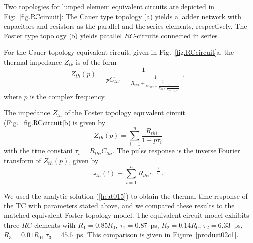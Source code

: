 \documentclass[journal]{IEEEtran}
\begin{document}
Two topologies for lumped element equivalent circuits are depicted in Fig:~\ref{fig.RCcircuit}: The Cauer type topology (a) yields a ladder network with capacitors and resistors as the parallel and the series elements, respectively. The Foster type topology (b) yields parallel $RC$-circuits connected in series.

For the Cauer topology equivalent circuit, given in Fig.~\ref{fig.RCcircuit}a, the thermal impedance $Z_{th}$ is of the form
%
\begin{equation} \label{thermalimpedance01}
	Z_{th}(p) = \frac{1}{p C_{th1}+\frac{1}{{R_{th1}+\frac{1}{p C_{th2}+\frac{1}{R_{th2}+\frac{1}{p C_{th3}+\frac{1}{{R_{th3}+ \cdots}}}}}}}} \, ,
\end{equation}
%
where $p$ is the complex frequency. 


%
The impedance $Z_{th}$ of the Foster topology equivalent circuit (Fig.~\ref{fig.RCcircuit}b) is given by
%
\begin{equation} \label{thermalimpedance02}
	Z_{th}(p) = \sum_{i=1}^n\frac{R_{thi}}{1+ p \tau_i }
\end{equation}
%
with the time constant $\tau_i = R_{thi}C_{thi}$. The pulse response  is the inverse Fourier transform of $Z_{th}(p)$, given  by
%
\begin{equation}
	z_{th}(t) = \sum_{i=1}^n  R_{thi}e^{-\frac{t}{ \tau_i }} \, .
\end{equation}
%

We used the analytic solution (\ref{heat015}) to obtain the thermal time response of the TC with parameters stated above, and we compared these results to the matched equivalent Foster topology model. The equivalent circuit model exhibits three $RC$ elements with $R_1=0.85 R_0$, $\tau_1 = 0.87$~ps, $R_2=0.14 R_0$, $\tau_2 = 6.33$~ps, $R_3=0.01 R_0$, $\tau_3 = 45.5$~ps. This comparison is given in Figure~\ref{product02c1}.

%
%
\end{document}
